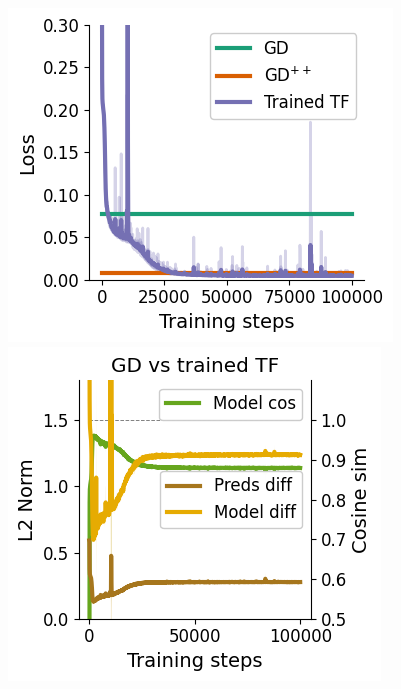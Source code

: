 \documentclass{article}
\theoremstyle{plain}
\theoremstyle{definition}
\theoremstyle{remark}
\begin{document}
\begin{figure}
\begin{center}
\begin{minipage}{.30\textwidth}
  \centering
  \begin{center}
    \includegraphics[width=1.\textwidth]{Final_figures/linear/twelve_layers/train_12.png}
  \end{center}
  \vspace{-10pt}
\end{minipage}
\begin{minipage}{.30\textwidth}
  \centering
  \begin{center}
    \includegraphics[width=1.\textwidth]{Final_figures/linear/twelve_layers/sim_12.png}

\end{center}
\end{minipage}
\end{center}
\end{figure}
\end{document}
